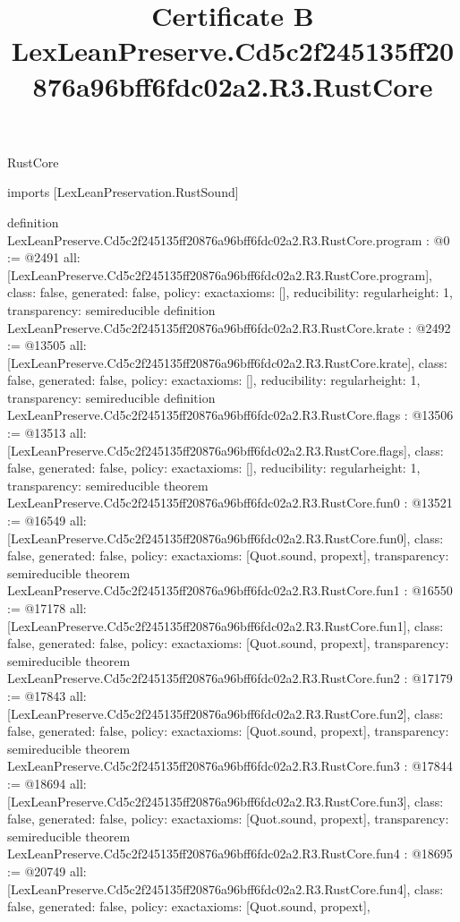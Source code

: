 \begin{lexlean}{RustCore}
\title{Certificate B LexLeanPreserve.Cd5c2f245135ff20876a96bff6fdc02a2.R3.RustCore}
\begin{coremodule}
imports [LexLeanPreservation.RustSound]

definition LexLeanPreserve.Cd5c2f245135ff20876a96bff6fdc02a2.R3.RustCore.program : @0 := @2491 {
  all: [LexLeanPreserve.Cd5c2f245135ff20876a96bff6fdc02a2.R3.RustCore.program],
  class: false,
  generated: false,
  policy: exact{axioms: []},
  reducibility: regular{height: 1},
  transparency: semireducible
}
definition LexLeanPreserve.Cd5c2f245135ff20876a96bff6fdc02a2.R3.RustCore.krate : @2492 := @13505 {
  all: [LexLeanPreserve.Cd5c2f245135ff20876a96bff6fdc02a2.R3.RustCore.krate],
  class: false,
  generated: false,
  policy: exact{axioms: []},
  reducibility: regular{height: 1},
  transparency: semireducible
}
definition LexLeanPreserve.Cd5c2f245135ff20876a96bff6fdc02a2.R3.RustCore.flags : @13506 := @13513 {
  all: [LexLeanPreserve.Cd5c2f245135ff20876a96bff6fdc02a2.R3.RustCore.flags],
  class: false,
  generated: false,
  policy: exact{axioms: []},
  reducibility: regular{height: 1},
  transparency: semireducible
}
theorem LexLeanPreserve.Cd5c2f245135ff20876a96bff6fdc02a2.R3.RustCore.fun0 : @13521 := @16549 {
  all: [LexLeanPreserve.Cd5c2f245135ff20876a96bff6fdc02a2.R3.RustCore.fun0],
  class: false,
  generated: false,
  policy: exact{axioms: [Quot.sound, propext]},
  transparency: semireducible
}
theorem LexLeanPreserve.Cd5c2f245135ff20876a96bff6fdc02a2.R3.RustCore.fun1 : @16550 := @17178 {
  all: [LexLeanPreserve.Cd5c2f245135ff20876a96bff6fdc02a2.R3.RustCore.fun1],
  class: false,
  generated: false,
  policy: exact{axioms: [Quot.sound, propext]},
  transparency: semireducible
}
theorem LexLeanPreserve.Cd5c2f245135ff20876a96bff6fdc02a2.R3.RustCore.fun2 : @17179 := @17843 {
  all: [LexLeanPreserve.Cd5c2f245135ff20876a96bff6fdc02a2.R3.RustCore.fun2],
  class: false,
  generated: false,
  policy: exact{axioms: [Quot.sound, propext]},
  transparency: semireducible
}
theorem LexLeanPreserve.Cd5c2f245135ff20876a96bff6fdc02a2.R3.RustCore.fun3 : @17844 := @18694 {
  all: [LexLeanPreserve.Cd5c2f245135ff20876a96bff6fdc02a2.R3.RustCore.fun3],
  class: false,
  generated: false,
  policy: exact{axioms: [Quot.sound, propext]},
  transparency: semireducible
}
theorem LexLeanPreserve.Cd5c2f245135ff20876a96bff6fdc02a2.R3.RustCore.fun4 : @18695 := @20749 {
  all: [LexLeanPreserve.Cd5c2f245135ff20876a96bff6fdc02a2.R3.RustCore.fun4],
  class: false,
  generated: false,
  policy: exact{axioms: [Quot.sound, propext]},
}
\end{coremodule}
\end{lexlean}

